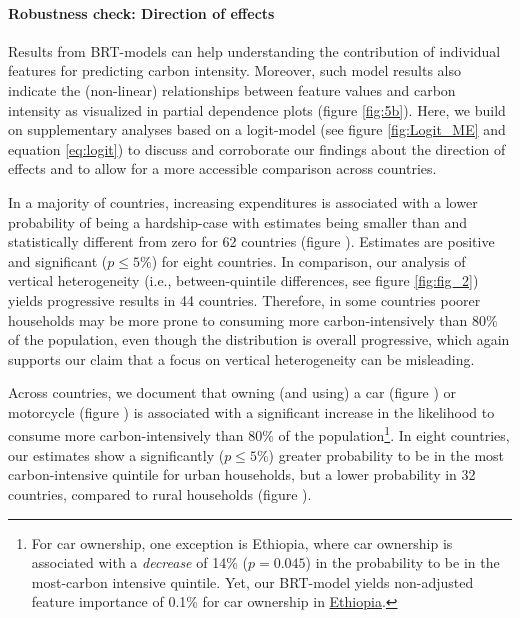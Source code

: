 \documentclass[12pt, a4paper]{article}
\begin{document}
\paragraph{Robustness check: Direction of effects}
Results from BRT-models can help understanding the contribution of individual features for predicting carbon intensity. Moreover, such model results also indicate the (non-linear) relationships between feature values and carbon intensity as visualized in partial dependence plots (figure \ref{fig:5b}). Here, we build on supplementary analyses based on a logit-model (see figure \ref{fig:Logit_ME} and equation \ref{eq:logit}) to discuss and corroborate our findings about the direction of effects and to allow for a more accessible comparison across countries.

In a majority of countries, increasing expenditures is associated with a lower probability of being a hardship-case with estimates being smaller than and statistically different from zero for 62 countries (figure ). Estimates are positive and significant ($p\leq 5\%$) for eight countries. In comparison, our analysis of vertical heterogeneity (i.e., between-quintile differences, see figure \ref{fig:fig_2}) yields progressive results in 44 countries. Therefore, in some countries poorer households may be more prone to consuming more carbon-intensively than 80\% of the population, even though the distribution is overall progressive, which again supports our claim that a focus on vertical heterogeneity can be misleading.

Across countries, we document that owning (and using) a car (figure ) or motorcycle (figure ) is associated with a significant increase in the likelihood to consume more carbon-intensively than 80\% of the population\footnote{For car ownership, one exception is Ethiopia, where car ownership is associated with a \textit{decrease} of 14\% ($p=0.045$) in the probability to be in the most-carbon intensive quintile. Yet, our BRT-model yields non-adjusted feature importance of 0.1\% for car ownership in \hyperref[fig:5b_ETH]{Ethiopia}.}. In eight countries, our estimates show a significantly ($p\leq 5\%$) greater probability to be in the most carbon-intensive quintile for urban households, but a lower probability in 32 countries, compared to rural households (figure ).
\end{document}
